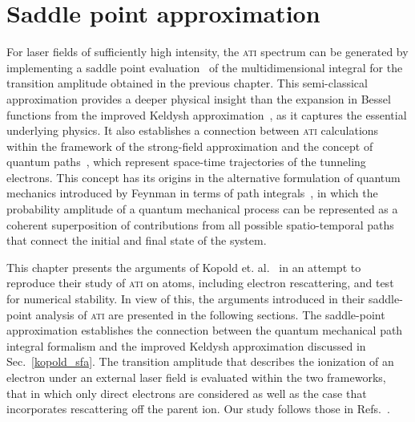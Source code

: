 \chapter{Saddle point approximation}
\label{cha:sp_approx}



For laser fields of sufficiently high intensity, the \textsc{ati}
spectrum can be generated by implementing a saddle point
evaluation~\cite{LewensteinSPA_1994} of the multidimensional integral
for the transition amplitude obtained in the previous chapter. This
semi-classical approximation provides a deeper physical insight than
the expansion in Bessel functions from the improved Keldysh
approximation~\cite{Kopold_1997sfa}, as it captures the essential
underlying physics. It also establishes a connection between
\textsc{ati} calculations within the framework of the strong-field
approximation and the concept of quantum
paths~\cite{KopoldOptComm2000}, which represent space-time
trajectories of the tunneling electrons. This concept has its origins
in the alternative formulation of quantum mechanics introduced by
Feynman in terms of path integrals~\cite{RevModPhysFeynman}, in which
the probability amplitude of a quantum mechanical process can be
represented as a coherent superposition of contributions from all
possible spatio-temporal paths that connect the initial and final
state of the system.

This chapter presents the arguments of Kopold
et. al.~\cite{KopoldOptComm2000,phd_Kopold} in an attempt to reproduce
their study of \textsc{ati} on atoms, including electron rescattering,
and test for numerical stability. In view of this, the arguments
introduced in their saddle-point analysis of \textsc{ati} are
presented in the following sections. The saddle-point approximation
establishes the connection between the quantum mechanical path
integral formalism and the improved Keldysh approximation discussed in
Sec.~\ref{kopold_sfa}. The transition amplitude that describes the
ionization of an electron under an external laser field is evaluated
within the two frameworks, that in which only direct electrons are
considered as well as the case that incorporates rescattering off the
parent ion. Our study follows those in Refs.~\cite{Kopold_1997sfa,
  KopoldOptComm2000}.


